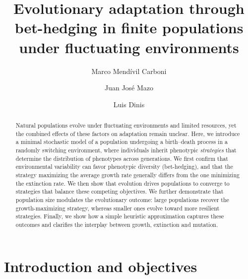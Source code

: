 \documentclass[aps,pre,reprint,10pt,superscriptaddress]{revtex4-2}
\begin{document}
\title{Evolutionary adaptation through bet-hedging in finite populations under fluctuating environments}
\author{Marco Mendívil Carboni}
\author{Juan José Mazo}
\author{Luis Dinis}

\begin{abstract}
    Natural populations evolve under fluctuating environments and limited resources, yet the combined effects of these factors on adaptation remain unclear. Here, we introduce a minimal stochastic model of a population undergoing a birth--death process in a randomly switching environment, where individuals inherit phenotypic \emph{strategies} that determine the distribution of phenotypes across generations. We first confirm that environmental variability can favor phenotypic diversity (bet-hedging), and that the strategy maximizing the average growth rate generally differs from the one minimizing the extinction rate. We then show that evolution drives populations to converge to strategies that balance these competing objectives. We further demonstrate that population size modulates the evolutionary outcome: large populations recover the growth-maximizing strategy, whereas smaller ones evolve toward more resilient strategies. Finally, we show how a simple heuristic approximation captures these outcomes and clarifies the interplay between growth, extinction and mutation.
\end{abstract}

\maketitle

\section{Introduction and objectives} \label{sec:introduction}
\end{document}
